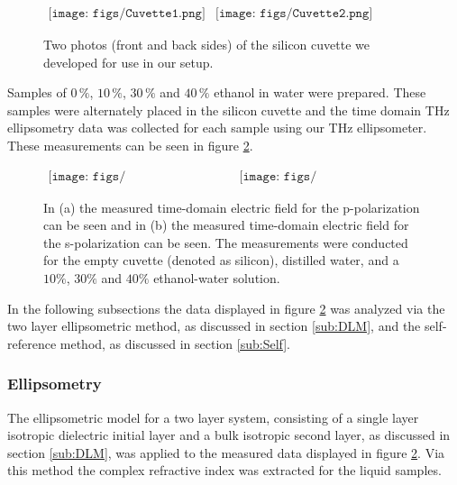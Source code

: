 \begin{figure}[H]
                \begin{center}$
								\begin{array}{cc}
                \texttt{[image: figs/Cuvette1.png]}&
                \texttt{[image: figs/Cuvette2.png]}
								\end{array}$
								\end{center}
	\caption[Photos of Silicon cuvette]{Two photos (front and back sides) of the silicon cuvette we developed for use in our setup.}
	\label{fig:CuvettePhoto}
\end{figure}

Samples of $0\,\%$, $10\,\%$, $30\,\%$ and $40\,\%$ ethanol in water were prepared. These samples were alternately placed in the silicon cuvette and the time domain THz ellipsometry data was collected for each sample using our THz ellipsometer.  These measurements can be seen in figure \ref{fig:CuvetteMesTime}.

\begin{figure}[H]
                \begin{center}$
								\begin{array}{cc}
                \texttt{[image: figs/P\_Time\_2Layer.png]}&
                \texttt{[image: figs/S\_Time\_2Layer.png]}
								\end{array}$
								\end{center}
	\caption[Time domain cuvette measurements]{In (a) the measured time-domain electric field for the p-polarization can be seen and in (b) the measured time-domain electric field for the s-polarization can be seen. The measurements were conducted for the empty cuvette (denoted as silicon), distilled water, and a $10\%$, $30\%$ and $40\%$ ethanol-water solution.}
	\label{fig:CuvetteMesTime}
\end{figure}

In the following subsections the data displayed in figure \ref{fig:CuvetteMesTime} was analyzed via the two layer ellipsometric method, as discussed in section \ref{sub:DLM}, and the self-reference method, as discussed in section \ref{sub:Self}. 

\subsubsection{Ellipsometry}
\label{sub: HR-Silicon-Water-Eth_ellips}

The ellipsometric model for a two layer system, consisting of a single layer isotropic dielectric initial layer and a bulk isotropic second layer, as discussed in section \ref{sub:DLM}, was applied to the measured data displayed in figure \ref{fig:CuvetteMesTime}. Via this method the complex refractive index was extracted for the liquid samples.

